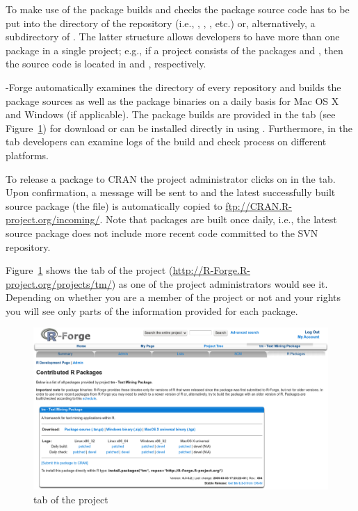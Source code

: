 To make use of the package builds and checks
the package source code has to be put into the  directory
of the repository (i.e., ,
, , etc.) or, alternatively, a
subdirectory of . The latter structure allows developers to
have more than one package in a single project; e.g., if
a project consists of the packages  and , then the
source code is located in  and ,
respectively.

\R{}-Forge automatically examines the  directory of
every repository and builds the package sources as well as the package
binaries on a daily basis for Mac OS X and Windows (if applicable). The
package builds
are provided in the  tab (see
Figure~\ref{fig:rpackages_tab}) for download or can be
installed directly in \R{} using
. Furthermore, in the  tab developers can examine logs of the build and check
process on different platforms.

To release a package to CRAN the project administrator clicks on
 in the  tab. Upon
confirmation, a message will be sent to  and
the latest successfully built source package (the  file) is
automatically
copied to \url{ftp://CRAN.R-project.org/incoming/}. Note that packages
are built once daily, i.e., the latest source package does not
include more recent code committed to the SVN repository.

Figure~\ref{fig:rpackages_tab} shows the  tab of the
 project (\url{http://R-Forge.R-project.org/projects/tm/}) as one of
the project administrators would see it. Depending on whether you are
a member of the project or not and your rights you will see only parts
of the information provided for each package.

\begin{figure}[th]
\centering
\includegraphics{rforge_tm_packages_developer_snapshot.png}
\caption{ tab of the  project}
\label{fig:rpackages_tab}
\end{figure}

